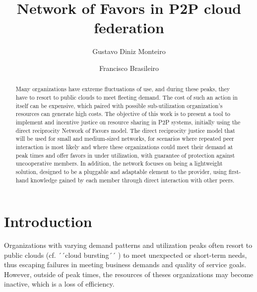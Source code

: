 \documentclass[acmsmall]{acmart}
\begin{document}
\title{Network of Favors in P2P cloud federation}

\author{Gustavo Diniz Monteiro}

\author{Francisco Brasileiro}

\begin{abstract}
Many organizations have extreme fluctuations of use, and during these peaks, they have to resort to public clouds to meet fleeting demand. The cost of such an action in itself can be expensive, which paired with possible sub-utilization organization's resources can generate high costs. The objective of this work is to present a tool to implement and incentive justice on resource sharing in P2P systems, initially using the direct reciprocity Network of Favors model. The direct reciprocity justice model that will be used for small and medium-sized networks, for scenarios where repeated peer interaction is most likely and where these organizations could meet their demand at peak times and offer favors in under utilization, with guarantee of protection against uncooperative members. In addition, the network focuses on being a lightweight solution, designed to be a pluggable and adaptable element to the provider, using first-hand knowledge gained by each member through direct interaction with other peers.
\end{abstract}


\maketitle

\section{Introduction}
Organizations with varying demand patterns and utilization peaks often resort to public clouds (cf. ´´cloud bursting´´ \cite{cloudburst}) to meet unexpected or short-term needs, thus escaping failures in meeting business demands and quality of service goals.
However, outside of peak times, the resources of theses organizations may become inactive, which is a loss of efficiency.
\end{document}
